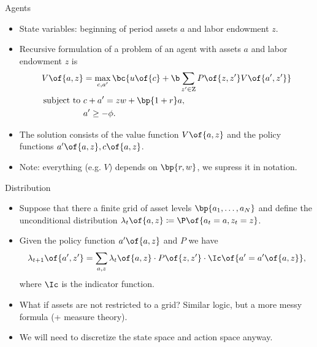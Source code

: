 \documentclass[11pt,xcolor={dvipsnames},aspectratio=159,hyperref={pdftex,pdfpagemode=UseNone,hidelinks,pdfdisplaydoctitle=true},usepdftitle=false]{beamer}
\begin{document}
    \begin{frame}{Agents}   
   
        \begin{itemize}
            \item State variables: beginning of period assets $a$ and labor endowment $z$.
            \item Recursive formulation of a problem of an agent with assets $a$ and labor endowment $z$ is 
            \begin{align*}
                V\of{a,z} &= \max_{c, a^\prime} \bc{u\of{c} + \b \sum_{z^\prime \in \text{Z}} P\of{z,z^\prime} V\of{a^\prime,z^\prime} } \\
                \text{subject to  } & c + a^\prime = z w + \bp{1+r} a, \\
                & a^\prime \geq -\phi.
            \end{align*}
            \item The solution consists of the value function $V\of{a,z}$ and the policy functions $a^\prime\of{a,z}, c\of{a,z}$. 
            \item Note: everything (e.g. $V$) depends on $\bp{r,w}$, we supress it in notation.
        \end{itemize}
        \end{frame}

\begin{frame}{Distribution}   
    \begin{itemize}
        \item Suppose that there a finite grid of asset levels $\bp{a_1,\dots,a_N}$ and define the unconditional distribution $\lambda_t\of{a,z} \coloneq  \P\of{a_t=a,z_t=z}$. 
       \item Given the policy function $a^\prime\of{a,z}$ and $P$ we have \begin{align*}
           \lambda_{t+1}\of{a^\prime,z^\prime} = \sum_{a,z} \lambda_t\of{a,z} \cdot P\of{z,z^\prime} \cdot \Ic\of{a^\prime = a^\prime\of{a,z}} , \end{align*}
   where $\Ic$ is the indicator function.
   \item What if assets are not restricted to a grid? Similar logic, but a more messy formula (+ measure theory).
   \item We will need to discretize the state space and action space anyway.
\end{itemize}
   \end{frame}
   
\end{document}
